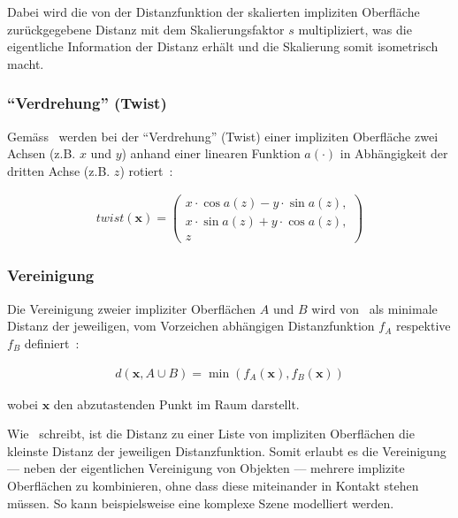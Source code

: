 Dabei wird die von der Distanzfunktion der skalierten impliziten Oberfläche
zurückgegebene Distanz mit dem Skalierungsfaktor $s$ multipliziert, was die
eigentliche Information der Distanz erhält und die Skalierung somit isometrisch
macht.

\subsubsection{``Verdrehung'' (Twist)}
\label{ssubsec:implicit_surfaces_ops_twist}

Gemäss~\citeauthor{hart_sphere_1994} werden bei der ``Verdrehung'' (Twist)
einer impliziten Oberfläche zwei Achsen (z.B. $x$ und $y$) anhand einer
linearen Funktion $a(\cdot)$ in Abhängigkeit der dritten Achse (z.B. $z$)
rotiert~\parencite[S. 543]{hart_sphere_1994}:

\begin{gather}
    twist(\bm{x}) = \begin{pmatrix} 
        x \cdot \cos{a(z)} - y \cdot \sin{a(z)},\\
        x \cdot \sin{a(z)} + y \cdot \cos{a(z)},\\
        z
    \end{pmatrix}
\end{gather}

\subsubsection{Vereinigung}
\label{ssubsec:implicit_surfaces_ops_union}

Die Vereinigung zweier impliziter Oberflächen $A$ und $B$ wird
von~\citeauthor{hart_sphere_1994} als minimale Distanz der jeweiligen,
vom Vorzeichen abhängigen Distanzfunktion $f_{A}$ respektive $f_{B}$
definiert~\parencite[S. 531 bis 532]{hart_sphere_1994}:

\begin{gather}
    d(\bm{x}, A \cup B) = \min(f_{A}(\bm{x}), f_{B}(\bm{x}))
\end{gather}

wobei $\bm{x}$ den abzutastenden Punkt im Raum darstellt.

Wie~\citeauthor{hart_sphere_1994} schreibt, ist die Distanz zu einer Liste von
impliziten Oberflächen die kleinste Distanz der jeweiligen Distanzfunktion.
Somit erlaubt es die Vereinigung --- neben der eigentlichen Vereinigung von
Objekten --- mehrere implizite Oberflächen zu kombinieren, ohne dass diese
miteinander in Kontakt stehen müssen. So kann beispielsweise eine komplexe
Szene modelliert werden.

